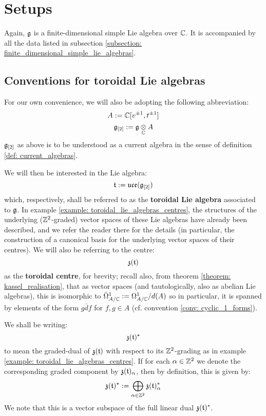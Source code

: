 \section{Setups}
    Again, $\mathfrak{g}$ is a finite-dimensional simple Lie algebra over $\mathbb{C}$. It is accompanied by all the data listed in subsection \ref{subsection: finite_dimensional_simple_lie_algebras}. 

    \subsection{Conventions for toroidal Lie algebras} \label{subsection: toroidal_lie_algebra_conventions}
        For our own convenience, we will also be adopting the following abbreviation:
            $$A := \mathbb{C}[v^{\pm 1}, t^{\pm 1}]$$
            $$\g_{[2]} := \g \tensor_{\bbC} A$$
        $\mathfrak{g}_{[2]}$ as above is to be understood as a current algebra in the sense of definition \ref{def: current_algebras}.
    
        We will then be interested in the Lie algebra:
            $$\mathfrak{t} := \mathfrak{uce}(\mathfrak{g}_{[2]})$$
        which, respectively, shall be referred to as the \textbf{toroidal Lie algebra} associated to $\mathfrak{g}$. In example \ref{example: toroidal_lie_algebras_centres}, the structures of the underlying ($\mathbb{Z}^2$-graded) vector spaces of these Lie algebras have already been described, and we refer the reader there for the details (in particular, the construction of a canonical basis for the underlying vector spaces of their centres). We will also be referring to the centre:
            $$\mathfrak{z}(\mathfrak{t})$$
        as the \textbf{toroidal centre}, for brevity; recall also, from theorem \ref{theorem: kassel_realisation}, that as vector spaces (and tautologically, also as abelian Lie algebras), this is isomorphic to $\bar{\Omega}^1_{A/\mathbb{C}} := \Omega^1_{A/\mathbb{C}}/d(A)$ so in particular, it is spanned by elements of the form $g \bar{d}f$ for $f, g \in A$ (cf. convention \ref{conv: cyclic_1_forms}).

        We shall be writing:
            $$\mathfrak{z}(\mathfrak{t})^{\star}$$
        to mean the graded-dual of $\mathfrak{z}(\mathfrak{t})$ with respect to its $\mathbb{Z}^2$-grading as in example \ref{example: toroidal_lie_algebras_centres}. If for each $\alpha \in \mathbb{Z}^2$ we denote the corresponding graded component by $\mathfrak{z}(\mathfrak{t})_{\alpha}$, then by definition, this is given by:
            $$\mathfrak{z}(\mathfrak{t})^{\star} := \bigoplus_{\alpha \in \mathbb{Z}^2} \mathfrak{z}(\mathfrak{t})_{\alpha}^*$$
        We note that this is a vector subspace of the full linear dual $\mathfrak{z}(\mathfrak{t})^*$.

